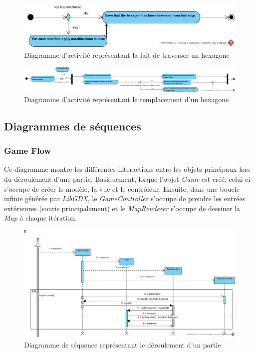 \documentclass[]{article}
\begin{document}
\begin{figure}[H]
\begin{center}
  \includegraphics[width=\textwidth]{Activity3.jpg}
  \caption{Diagramme d'activité représentant la fait de traverser un hexagone}\label{fig:auto}
\end{center}
\end{figure}

\begin{figure}[H]
\begin{center}
  \includegraphics[width=\textwidth]{Activity4.jpg}
  \caption{Diagramme d'activité représentant le remplacement d'un hexagone}\label{fig:auto}
\end{center}
\end{figure}

\subsection{Diagrammes de séquences}

\subsubsection{Game Flow}

Ce diagramme montre les différentes interactions entre les objets principaux lors du déroulement d'une partie. Basiquement, lorque l'objet \emph{Game} est créé, celui-ci s'occupe de créer le modèle, la vue et le contrôleur. Ensuite, dans une boucle infinie générée par \emph{LibGDX}, le \emph{GameController} s'occupe de prendre les entrées extérieures (souris principalement) et le \emph{MapRenderer} s'occupe de dessiner la \emph{Map} à chaque itération.

\begin{figure}[H]
\begin{center}
  \includegraphics[width=\textwidth]{Sequence1.jpg}
  \caption{Diagramme de séquence représentant le déroulement d'un partie}\label{fig:auto}
\end{center}
\end{figure}
\end{document}
